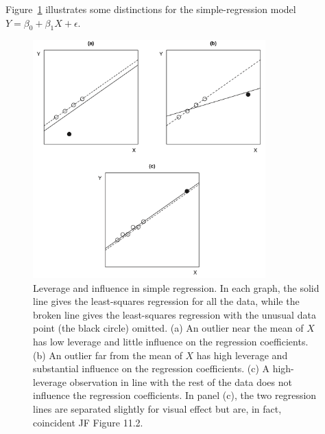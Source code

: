 Figure~\ref{fig:leverage_and_influence} illustrates some distinctions for the simple-regression model $Y=\beta_0 + \beta_1 X + \epsilon$.
%
\begin{figure}[H]
\begin{center}
  \includegraphics[width=0.8\textwidth]{Lecture16/JF_11_2}
  \caption{Leverage and influence in simple regression.
  In each graph, the solid line gives the least-squares regression for all the data, while the broken line gives the least-squares regression with the unusual data point (the black circle) omitted.
  (a) An outlier near the mean of $X$ has low leverage and little influence on the regression coefficients.
  (b) An outlier far from the mean of $X$ has high leverage and substantial influence on the regression coefficients.
  (c) A high-leverage observation in line with the rest of the data does not influence the regression coefficients.
  In panel (c), the two regression lines are separated slightly for visual effect but are, in fact, coincident
   JF Figure 11.2.}
  \label{fig:leverage_and_influence}
\end{center}
\end{figure}
%


